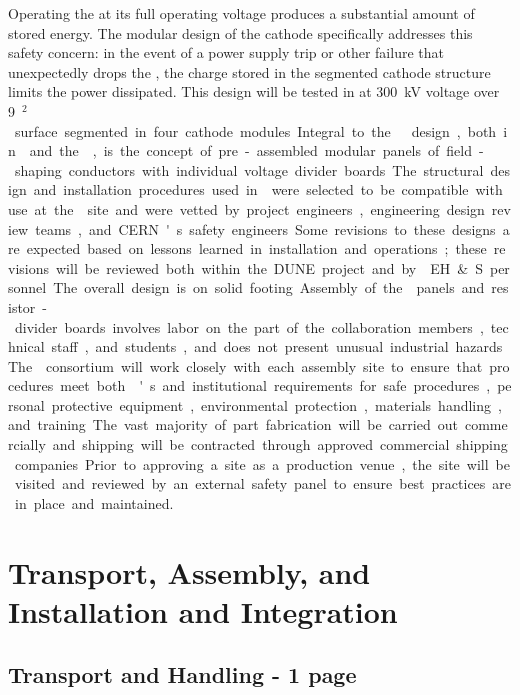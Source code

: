 Operating the  at its full operating voltage produces a substantial amount of stored energy. The modular design of the cathode specifically addresses this safety concern: in the event of a power supply trip or other failure that unexpectedly drops the , the charge stored in the segmented cathode structure limits the power dissipated. 
This design will be tested in  at \SI{300}{kV} voltage over \SI{9}{\m$^2$} surface segmented in four cathode modules.  

Integral to the   design, both in  and the \dpmod, is the concept of pre-assembled modular panels of field-shaping conductors with individual voltage divider boards. The structural design and installation procedures used in  were selected to be compatible with use at the  site and were vetted by project engineers, engineering design review teams, and CERN's safety engineers. Some revisions to these designs are expected based on lessons learned in installation and operations; these revisions will be reviewed both within the DUNE project and by \fnal EH\&S personnel. The overall design is on solid footing. 

Assembly of the  panels and resistor-divider boards involves labor on the part of the collaboration members, technical staff, and students, and  does not present unusual industrial hazards. The  consortium will work closely with each assembly site to ensure that procedures meet both \fnal{}'s and institutional requirements for safe procedures, personal protective equipment, environmental protection, %
materials handling, and training. The vast majority of %
part fabrication will be carried out commercially and shipping will be contracted through approved commercial shipping companies. Prior to approving a site as a production venue, the site will be visited and reviewed by an external safety panel to ensure best practices are in place and maintained. 


\section{Transport, Assembly, and Installation and Integration}
\label{sec:fddp-hv-transport}

\subsection{Transport and Handling - 1 page}
\label{sec:fddp-hv-transport-transport}

